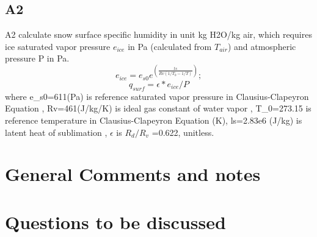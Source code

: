 \documentclass{article}
\begin{document}
\subsection{A2}
A2 calculate snow surface specific humidity in unit kg H2O/kg air, which requires ice saturated vapor pressure $e_{ice}$ in Pa (calculated from $T_{air}$) and atmospheric pressure P in Pa.
\begin{equation}
e_{ice}=e_{s0}  e^{(\frac{ls}{Rv(1/T_0-1/T)})};
\end{equation}\begin{equation}
q_{surf}=\epsilon * e_{ice}/P
\end{equation}
where e_s0=611(Pa) is reference saturated vapor pressure in Clausius-Clapeyron Equation , Rv=461(J/kg/K) is ideal gas constant of water vapor , T_0=273.15 is reference temperature in Clausius-Clapeyron Equation (K), ls=2.83e6 (J/kg) is latent heat of sublimation , $\epsilon$ is $R_d/R_v$ =0.622, unitless.



\section{General Comments and notes}
\section{Questions to be discussed}
\end{document}
